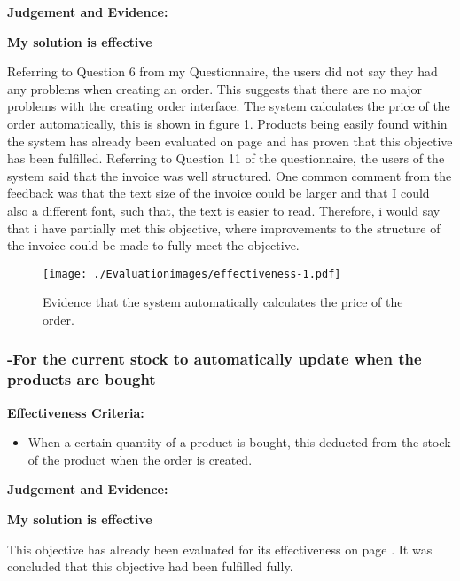 \textbf{Judgement and Evidence:} \newline

\textbf{\large{My solution is effective}}

Referring to Question 6 from my Questionnaire, the users did not say they had any problems when creating an order. This suggests that there are no major problems with the creating order interface. The system calculates the price of the order automatically, this is shown in figure \ref{fig:effectiveness-1}. Products being easily found within the system has already been evaluated on page \pageref{fig:search-evidence} and has proven that this objective has been fulfilled. Referring to Question 11 of the questionnaire, the users of the system said that the invoice was well structured. One common comment from the feedback was that the text size of the invoice could be larger and that I could also a different font, such that, the text is easier to read. Therefore, i would say that i have partially met this objective, where improvements to the structure of the invoice could be made to fully meet the objective.

\begin{figure}[H]
\caption{Evidence that the system automatically calculates the price of the order.} \label{fig:effectiveness-1}
\hfill\texttt{[image: ./Evaluationimages/effectiveness-1.pdf]}
\end{figure}





\pagebreak
\subsubsection{-For the current stock to automatically update when the products are bought}

\textbf{Effectiveness Criteria:}\newline
\begin{itemize}
	\item{When a certain quantity of a product is bought, this deducted from the stock of the product when the order is created.}
\end{itemize}
\textbf{Judgement and Evidence:} \newline

\textbf{\large{My solution is effective}}

This objective has already been evaluated for its effectiveness on page \pageref{stock-change-effectiveness}. It was concluded that this objective had been fulfilled fully.



